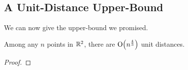\subsection{A Unit-Distance Upper-Bound}

We can now give the upper-bound we promised.

\begin{boxtheorem} \label{Ch7:Thm:Unit_Distance_Upper_Bound}
    Among any $n$ points in $\mathbb{R}^2$, there are $\operatorname{O}\!\left( n^{\frac{4}{3}} \right)$ unit distances.
\end{boxtheorem}
\begin{proof}
    \sorry
\end{proof}
